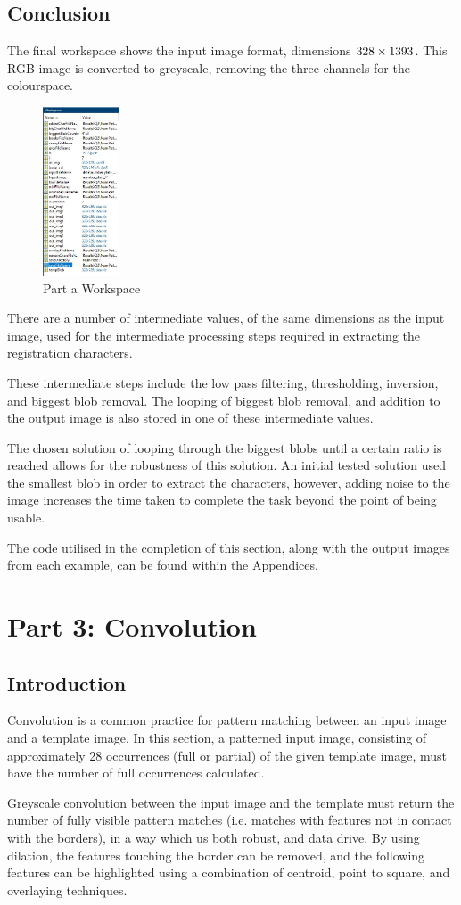 \documentclass[a4paper]{article}
\begin{document}
	\subsection{Conclusion}
	The final workspace shows the input image format, dimensions $328 \times
	1393 \time 3$. This RGB image is converted to greyscale, removing the
	three channels for the colourspace.
	\begin{figure}[H]
		\centering
		\includegraphics[height=5cm]{Results/Q2/NumPlate6/Workspace.jpg}%
		\caption{Part a Workspace}
		\label{fig:}
	\end{figure}
	\par There are a number of intermediate values, of the same dimensions
	as the input image, used for the intermediate processing steps required
	in extracting the registration characters.
	\par These intermediate steps include the low pass filtering,
	thresholding, inversion, and biggest blob removal. The looping of
	biggest blob removal, and addition to the output image is also stored in
	one of these intermediate values.
	\par The chosen solution of looping through the biggest blobs until a
	certain ratio is reached allows for the robustness of this solution. An
	initial tested solution used the smallest blob in order to extract the
	characters, however, adding noise to the image increases the time taken
	to complete the task beyond the point of being usable.
	\par The code utilised in the completion of this section, along with the
	output images from each example, can be found within the Appendices.
	\section{Part 3: Convolution}
	\subsection{Introduction}
	Convolution is a common practice for pattern matching between an input
	image and a template image. In this section, a patterned input image,
	consisting of approximately 28 occurrences (full or partial) of the
	given template image, must have the number of full occurrences
	calculated.
	\par Greyscale convolution between the input image and the template must
	return the number of fully visible pattern matches (i.e. matches with
	features not in contact with the borders), in a way which us both
	robust, and data drive. By using dilation, the features touching the
	border can be removed, and the following features can be highlighted
	using a combination of centroid, point to square, and overlaying
	techniques.
\end{document}
